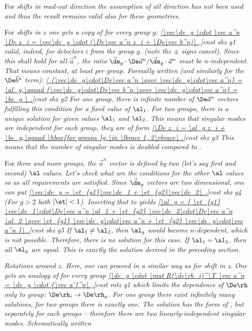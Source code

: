 For \em{shifts in read-out direction} the assumption of all direction has not been used and thus the result  remains valid also for these geometries.

For \em{shifts in $z$} one gets a copy of  for every group $g$:
\eqref{\vec\de_g \cdot \vec a^n \De z_i = \vec\de_g \cdot (\De\vec a^n z_i + \De\vec b^n)\ ,}{cnst shz g1}
valid, indeed, for detectors $i$ from the group $g$. (note the $\pm$ signs cancel). Since this shall hold for all $\vec a^n$, the ratio $\vec\de_g\cdot\De\vec a^n / \vec\de_g\cdot\vec a^n$ must be $n$-independent. That means constant, at least per group. Formally written (and similarly for the $\De\vec b^n$ term):
\eqref{
{\vec\de_g\cdot\De\vec a^n \over \vec\de_g\cdot\vec a^n} = \al_g,\qquad
{\vec\de_g\cdot\De\vec b^n \over \vec\de_g\cdot\vec a^n} = \be_g
\ .}{cnst shz g2}
For \em{one group}, there is infinite number of $\De\vec a^n$ vectors fulfilling this condition for a fixed value of $\al_1$. For \em{two groups}, there is a unique solution for given values $\al_1$ and $\al_2$. This means that singular modes are independent for each group, they are of form
\eqref{\De z_i = \al_g z_i + \be_g,\qquad \hbox{for groups }g \in \lbrace 1, 2\rbrace\ .}{cnst shz g3}
This means that the number of singular modes is doubled compared to .

For \em{three and more groups}, the $\vec a^n$ vector is defined by two (let's say first and second) $\al$ values. Let's check what are the conditions for the other $\al$ values so as all requirements  are satisfied. Since $\vec\de_g$ vectors are two dimensional, one can put
\eqref{\vec\de_g = \et_{g1}\vec\de_1 + \et_{g2}\vec\de_2\ .}{cnst shz g4}
(For $g>2$ both $|\et| < 1$). Inserting that to  yields
\eqref{\al_g = {
\et_{g1} \vec\de_1\cdot\De\vec a^n \al_1 + \et_{g2} \vec\de_2\cdot\De\vec a^n \al_2
\over
\et_{g1} \vec\de_g\cdot\vec a^n + \et_{g2} \vec\de_g\cdot\vec a^n
}\ .}{cnst shz g5}
If $\al_1 \neq \al_2$, then $\al_g$ would become $n$-dependent, which is not possible. Therefore, there is no solution for this case. If $\al_1 = \al_2$, then all $\al_g$ are equal. This is exactly the solution  derived in the preceding section.

\em{Rotations around $z$}. Here, one can proceed in a similar way as for shift in z. One gets an analogy of  for every group
\eqref{\de_g \cdot \mat R(\de\rh_i)^\T \vec a^n = \de_g \cdot {\vec a'}^n\ ,}{cnst rotz g1}
 which limits the dependence of $\De\rh$ only to group: $\De\rh_i \rightarrow \De\rh_g$. For \em{one} group there exist infinitely many solutions, for \em{two groups} there is exactly one. The solution has the form of , but separately for each groups -- therefore there are two linearly-independent singular modes. Schematically written

